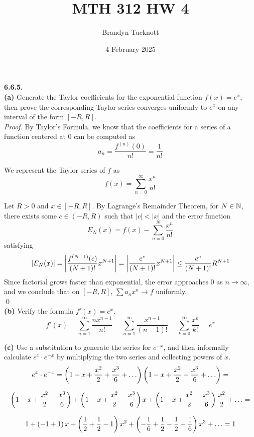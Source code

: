 \documentclass{exam}
\title{MTH 312 HW 4}
\author{Brandyn Tucknott}
\date{4 February 2025}
\begin{document}
\maketitle

\begin{questions}
    \textbf{6.6.5. } \\
\textbf{(a) }
Generate the Taylor coefficients for the exponential function $f(x) = e^x$, then prove the corresponding Taylor series converges uniformly to $e^x$ on any interval of the form $[-R, R]$. \\
\textit{Proof. }
By Taylor's Formula, we know that the coefficients for a series of a function centered at $0$ can be computed as
$$a_n = \frac{f^{(n)}(0)}{n!} = \frac{1}{n!}$$

We represent the Taylor series of $f$ as
$$f(x) = \sum_{n = 0}^\infty \frac{x^n}{n!}$$

Let $R > 0$ and $x\in [-R, R]$. By Lagrange's Remainder Theorem, for $N\in \mathbb {N}$, there exists some $c \in (-R, R)$ such that $|c| < |x|$ and the error function
$$E_N(x) = f(x) - \sum_{n = 0}^N \frac{x^n}{n!}$$
satisfying
$$\left| E_N(x) \right| = \left| \frac{f^{(N + 1)}(c)}{(N + 1)!}x^{N + 1} \right| = \left| \frac{e^c}{(N + 1)!}x^{N + 1} \right| \leq \frac{e^c}{(N + 1)!}R^{N + 1}$$
Since factorial grows faster than exponential, the error approaches 0 as $n \rightarrow \infty$, and we conclude that on $[-R, R]$, $\sum a_nx^n \rightarrow f$ uniformly. \\ \qed \\



\textbf{(b) }
Verify the formula $f'(x) = e^x$.
\sol
$$f'(x) = \sum_{n = 1}^\infty \frac{nx^{n - 1}}{n!} = \sum_{n = 1}^\infty \frac{x^{n - 1}}{(n - 1)!} = \sum_{k = 0}^\infty \frac{x^k}{k!} = e^x$$

\textbf{(c) }
Use a substitution to generate the series for $e^{-x}$, and then informally calculate $e^x\cdot e^{-x}$ by multiplying the two series and collecting powers of $x$.
\sol
$$e^x\cdot e^{-x} = \left( 1 + x + \frac{x^2}{2} + \frac{x^3}{6} + \hdots \right)\left( 1 - x + \frac{x^2}{2} - \frac{x^3}{6} + \hdots \right) =$$

$$\left( 1 - x + \frac{x^2}{2} - \frac{x^3}{6} \right) + \left( 1 - x + \frac{x^2}{2} - \frac{x^3}{6} \right)x + \left( 1 - x + \frac{x^2}{2} - \frac{x^3}{6} \right)\frac{x^2}{2} + \hdots =$$

$$1 + \left( -1 + 1 \right)x + \left( \frac{1}{2} + \frac{1}{2} - 1 \right)x^2 + \left( -\frac{1}{6} + \frac{1}{2} - \frac{1}{2} + \frac{1}{6} \right)x^3 + \hdots = 1$$



\end{questions}
\end{document}
